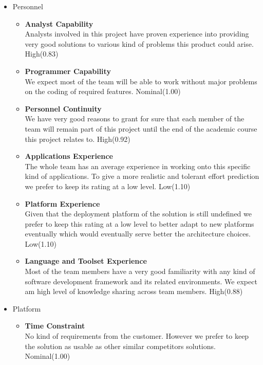 \begin{itemize}
    \item Personnel
    \begin{itemize}
        \item \textbf{Analyst Capability}\\
        Analysts involved in this project have proven experience into providing very good solutions to various kind of problems this product could arise. 
        \hfill High(0.83)
        
        \item \textbf{Programmer Capability}\\
        We expect most of the team will be able to work without major problems on the coding of required features.
        \hfill Nominal(1.00)
        
        \item \textbf{Personnel Continuity}\\
        We have very good reasons to grant for sure that each member of the team will remain part of this project until the end of the academic course this project relates to.
        \hfill High(0.92)
        
        \item \textbf{Applications Experience}\\
        The whole team has an average experience in working onto this specific kind of applications. To give a more realistic and tolerant effort prediction we prefer to keep its rating at a low level.
        \hfill Low(1.10)
        
        \item \textbf{Platform Experience}\\
        Given that the deployment platform of the solution is still undefined we prefer to keep this rating at a low level to better adapt to new platforms eventually which would eventually serve better the architecture choices.
        \hfill Low(1.10)
        
        \item \textbf{Language and Toolset Experience}\\
        Most of the team members have a very good familiarity with any kind of software development framework and its related environments. We expect am high level of knowledge sharing across team members.
        \hfill High(0.88)
    \end{itemize}
    
    \item Platform
    \begin{itemize}
        \item \textbf{Time Constraint}\\
        No kind of requirements from the customer. However we prefer to keep the solution as usable as other similar competitors solutions.
        \hfill Nominal(1.00)
        

\end{itemize}
\end{itemize}
